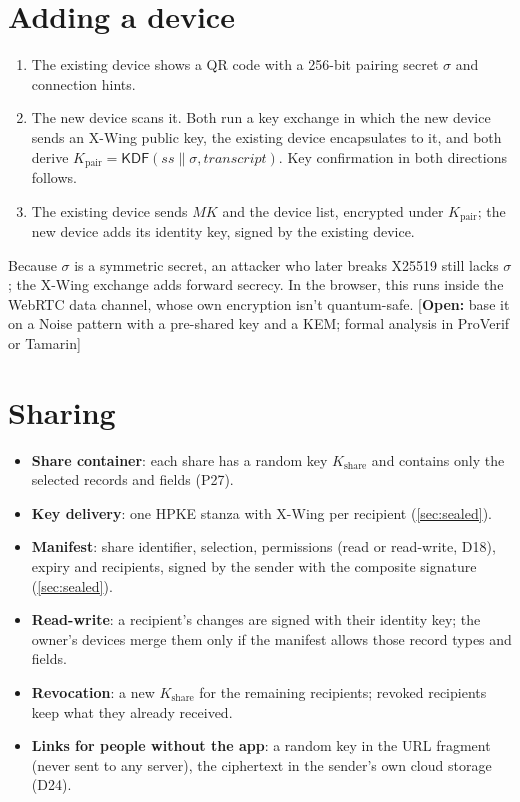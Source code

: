 \documentclass[11pt,a4paper]{article}
\newcommand{\concat}{\mathbin{\|}}
\newcommand{\KDF}{\mathsf{KDF}}
\newcommand{\todo}[1]{\textcolor{red!70!black}{[\textbf{Open:} #1]}}
\newcommand{\dref}[1]{\textsf{#1}} %
\begin{document}
\section{Adding a device}
\label{sec:pairing}

\begin{enumerate}
  \item The existing device shows a QR code with a 256-bit pairing secret $\sigma$ and connection hints.
  \item The new device scans it. Both run a key exchange in which the new device sends an X-Wing public key, the existing device encapsulates to it, and both derive $K_{\mathrm{pair}} = \KDF(ss \concat \sigma, \mathit{transcript})$. Key confirmation in both directions follows.
  \item The existing device sends $MK$ and the device list, encrypted under $K_{\mathrm{pair}}$; the new device adds its identity key, signed by the existing device.
\end{enumerate}
Because $\sigma$ is a symmetric secret, an attacker who later breaks X25519 still lacks $\sigma$; the X-Wing exchange adds forward secrecy. In the browser, this runs inside the WebRTC data channel, whose own encryption isn't quantum-safe. \todo{base it on a Noise pattern with a pre-shared key and a KEM; formal analysis in ProVerif or Tamarin}

\section{Sharing}
\label{sec:sharing}

\begin{itemize}
  \item \textbf{Share container}: each share has a random key $K_{\mathrm{share}}$ and contains only the selected records and fields (\dref{P27}).
  \item \textbf{Key delivery}: one HPKE stanza with X-Wing per recipient (\cref{sec:sealed}).
  \item \textbf{Manifest}: share identifier, selection, permissions (read or read-write, \dref{D18}), expiry and recipients, signed by the sender with the composite signature (\cref{sec:sealed}).
  \item \textbf{Read-write}: a recipient's changes are signed with their identity key; the owner's devices merge them only if the manifest allows those record types and fields.
  \item \textbf{Revocation}: a new $K_{\mathrm{share}}$ for the remaining recipients; revoked recipients keep what they already received.
  \item \textbf{Links for people without the app}: a random key in the URL fragment (never sent to any server), the ciphertext in the sender's own cloud storage (\dref{D24}).
\end{itemize}
\end{document}
